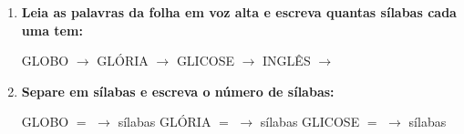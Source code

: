 \begin{exercicio}
\begin{enumerate}[resume]
  \item \textbf{Leia as palavras da folha em voz alta e escreva quantas sílabas cada uma tem:}

  \begin{center}
  GLOBO $\rightarrow$ \underline{\hspace{1cm}} \quad GLÓRIA $\rightarrow$ \underline{\hspace{1cm}} \quad GLICOSE $\rightarrow$ \underline{\hspace{1cm}} \quad INGLÊS $\rightarrow$ \underline{\hspace{1cm}}
  \end{center}

  \item \textbf{Separe em sílabas e escreva o número de sílabas:}
  \begin{center}
  GLOBO $=$ \underline{\hspace{1.2cm}} $\rightarrow$ \underline{\hspace{0.8cm}} sílabas \quad GLÓRIA $=$ \underline{\hspace{1.2cm}} $\rightarrow$ \underline{\hspace{0.8cm}} sílabas \quad GLICOSE $=$ \underline{\hspace{1.2cm}} $\rightarrow$ \underline{\hspace{0.8cm}} sílabas
  \end{center}

\end{enumerate}

\end{exercicio}




